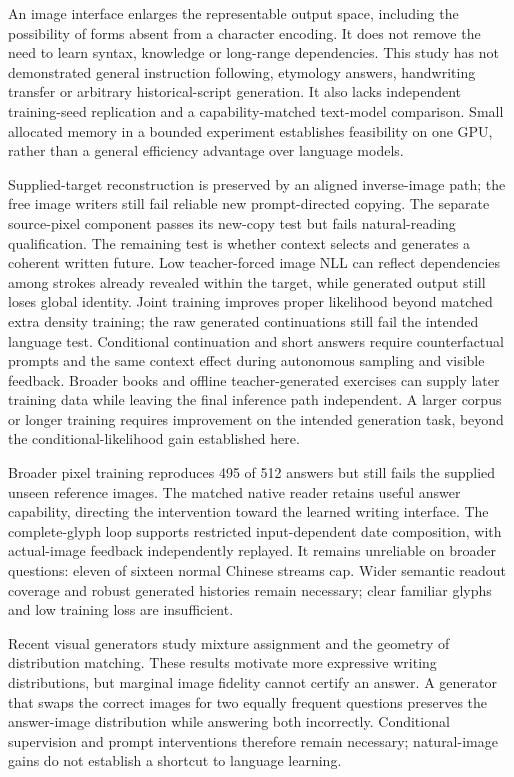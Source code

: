 An image interface enlarges the representable output space, including the
possibility of forms absent from a character encoding. It does not remove the
need to learn syntax, knowledge or long-range dependencies. This study has not
demonstrated general instruction following, etymology answers, handwriting
transfer or arbitrary historical-script generation. It also lacks independent
training-seed replication and a capability-matched text-model comparison.
Small allocated memory in a bounded experiment establishes feasibility on one
GPU, rather than a general efficiency advantage over language models.

Supplied-target reconstruction is preserved by an aligned inverse-image path;
the free image writers still fail reliable new prompt-directed copying. The separate
source-pixel component passes its new-copy test but fails natural-reading
qualification. The remaining test is whether context selects and generates a
coherent written future. Low teacher-forced
image NLL can reflect dependencies among strokes already revealed within the
target, while generated output still loses global identity. Joint training
improves proper likelihood beyond matched extra density training; the raw
generated continuations still fail the intended language test. Conditional
continuation and short answers require counterfactual prompts and the same
context effect during autonomous sampling and visible feedback.
Broader books and offline teacher-generated exercises can supply later
training data while leaving the final inference path independent. A larger
corpus or longer training requires improvement on the intended generation
task, beyond the conditional-likelihood gain established here.

Broader pixel training reproduces 495 of 512 answers but still fails the
supplied unseen reference images. The matched native reader retains useful
answer capability, directing the intervention toward the learned writing
interface. The complete-glyph loop supports restricted input-dependent date
composition, with actual-image feedback independently replayed. It remains
unreliable on broader questions: eleven of sixteen normal Chinese streams cap.
Wider semantic readout coverage and robust generated histories remain
necessary; clear familiar glyphs and low training loss are insufficient.


Recent visual generators study mixture assignment and the geometry of
distribution matching\cite{mgflow,semot}. These results motivate more expressive
writing distributions, but marginal image fidelity cannot certify an answer.
A generator that swaps the correct images for two equally frequent questions
preserves the answer-image distribution while answering both incorrectly.
Conditional supervision and prompt interventions therefore remain necessary;
natural-image gains do not establish a shortcut to language learning.

